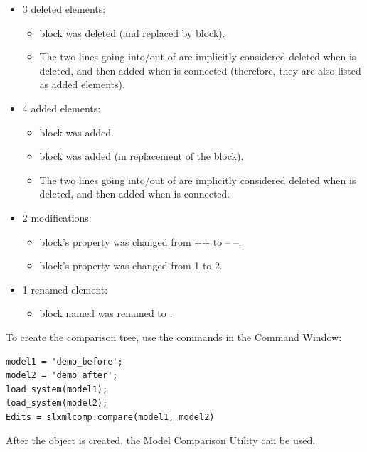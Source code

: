 \documentclass{article}
\makeatletter
\newcommand{\ToolName}{Model Comparison Utility\@\xspace}
\newcommand{\EditsObj}{\keyword{xmlcomp.Edits}\@\xspace}
\makeatother
\begin{document}
\begin{itemize}
\item 3 deleted elements:
	\begin{itemize}
		\item {} block was deleted (and replaced by  block).
		\item The two lines going into/out of  are implicitly considered deleted when  is deleted, and then added when  is connected (therefore, they are also listed as added elements).

	\end{itemize}
\item 4 added elements:
	\begin{itemize}
		\item {} block was added.
		\item {} block was added (in replacement of the  block).
		\item The two lines going into/out of  are implicitly considered deleted when  is deleted, and then added when  is connected. 
	\end{itemize}

\item 2 modifications:
	\begin{itemize}
		\item {} block's  property was changed from ++ to -- --.
		\item {} block's  property was changed from 1 to 2.
	\end{itemize}
\item 1 renamed element:
	\begin{itemize}
		\item {} block named  was renamed to .
	\end{itemize}
\end{itemize}

\noindent
To create the comparison tree, use the commands in the Command Window:

\begin{lstlisting}
model1 = 'demo_before';
model2 = 'demo_after';
load_system(model1);
load_system(model2);
Edits = slxmlcomp.compare(model1, model2)
\end{lstlisting}

After the \EditsObj object is created, the \ToolName can be used.
\end{document}
